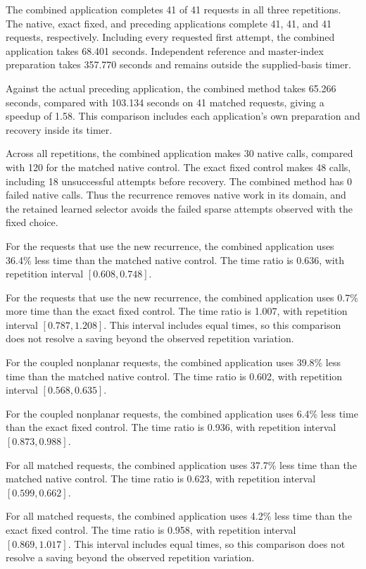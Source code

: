 The combined application completes 41 of 41 requests in all three repetitions. The native, exact fixed, and preceding applications complete 41, 41, and 41 requests, respectively. Including every requested first attempt, the combined application takes 68.401 seconds. Independent reference and master-index preparation takes 357.770 seconds and remains outside the supplied-basis timer.

Against the actual preceding application, the combined method takes 65.266 seconds, compared with 103.134 seconds on 41 matched requests, giving a speedup of 1.58. This comparison includes each application's own preparation and recovery inside its timer.

Across all repetitions, the combined application makes 30 native calls, compared with 120 for the matched native control. The exact fixed control makes 48 calls, including 18 unsuccessful attempts before recovery. The combined method has 0 failed native calls. Thus the recurrence removes native work in its domain, and the retained learned selector avoids the failed sparse attempts observed with the fixed choice.

For the requests that use the new recurrence, the combined application uses 36.4\% less time than the matched native control. The time ratio is 0.636, with repetition interval $[0.608,0.748]$.

For the requests that use the new recurrence, the combined application uses 0.7\% more time than the exact fixed control. The time ratio is 1.007, with repetition interval $[0.787,1.208]$. This interval includes equal times, so this comparison does not resolve a saving beyond the observed repetition variation.

For the coupled nonplanar requests, the combined application uses 39.8\% less time than the matched native control. The time ratio is 0.602, with repetition interval $[0.568,0.635]$.

For the coupled nonplanar requests, the combined application uses 6.4\% less time than the exact fixed control. The time ratio is 0.936, with repetition interval $[0.873,0.988]$.

For all matched requests, the combined application uses 37.7\% less time than the matched native control. The time ratio is 0.623, with repetition interval $[0.599,0.662]$.

For all matched requests, the combined application uses 4.2\% less time than the exact fixed control. The time ratio is 0.958, with repetition interval $[0.869,1.017]$. This interval includes equal times, so this comparison does not resolve a saving beyond the observed repetition variation.

